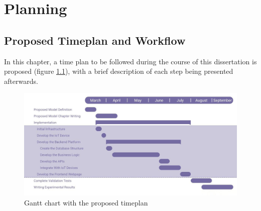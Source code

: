 
%

\chapter{Planning}
\label{cha:Planning}

\section{Proposed Timeplan and Workflow}
In this chapter, a time plan to be followed during the course of this
dissertation is proposed (figure \ref{fig:timeplan}), with a brief description
of each step being presented afterwards.

\begin{figure}[htbp]
	\centering
	\includegraphics[width=\textwidth]{Chapters/Figures/Planning/Planning.jpeg}
	\caption{Gantt chart with the proposed timeplan}
	\label{fig:timeplan}
\end{figure}

